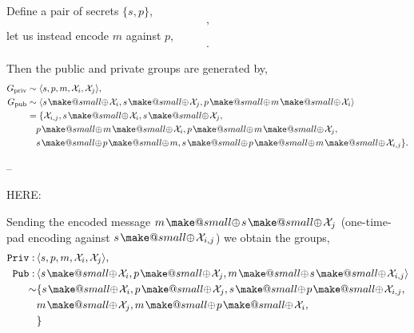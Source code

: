 \documentclass[twocolumn, aps, amsmath, amssymb, nofootinbib, superscriptaddress, longbibliography, doublefloatfix, table-of-contents, eqsecnum, rmp]{revtex4-2}
\makeatletter
\newcommand{\soplus}{{{\hspace{1pt}}{\mathbin{\mathpalette\make@small{\mathbin\oplus}}}}{\hspace{1pt}}}
\newcommand{\make@small}[2]{%
  \vcenter{\hbox{%
    \scalebox{0.6}{$\m@th#1#2$}%
  }}%
}
\makeatother
\begin{document}
Define a pair of secrets $\{s,p\}$,
\begin{align}
	[s, s\soplus p],
\end{align}
let us instead encode $m$ against $p$,
 \begin{align}
	[p, m\soplus p \soplus \mathcal{X}_i].
\end{align}

Then the public and private groups are generated by,
\begin{align}
	G_\mathrm{priv} &\sim \langle s,p,m,\mathcal{X}_i,\mathcal{X}_j \rangle, \nonumber\\
	G_\mathrm{pub} &\sim \langle s\soplus \mathcal{X}_i, s\soplus \mathcal{X}_j, p\soplus m\soplus \mathcal{X}_i \rangle \nonumber\\
	&= \{ \mathcal{X}_{i,j}, s\soplus \mathcal{X}_i, s\soplus \mathcal{X}_j, \nonumber\\
	&\quad p\soplus m\soplus \mathcal{X}_i, p\soplus m\soplus \mathcal{X}_j, \nonumber\\
	&\quad s\soplus p \soplus m, s \soplus p\soplus m \soplus \mathcal{X}_{i,j} \}.
\end{align}


--

HERE:

Sending the encoded message $m\soplus s \soplus \mathcal{X}_{j}$ (one-time-pad encoding against $s\soplus \mathcal{X}_{i,j}$) we obtain the groups,
\begin{align}
	\mathtt{Priv}:\, &\langle s, p, m, \mathcal{X}_i, \mathcal{X}_j\rangle,\nonumber\\
	\mathtt{Pub}:\, &\langle s\soplus \mathcal{X}_i, p\soplus \mathcal{X}_j, m \soplus s \soplus \mathcal{X}_{i,j} \rangle \nonumber\\
	\sim &\{ s\soplus \mathcal{X}_i, p\soplus \mathcal{X}_j, s\soplus p\soplus \mathcal{X}_{i,j},\nonumber\\
	&m \soplus \mathcal{X}_j, m \soplus p \soplus \mathcal{X}_i,\nonumber\\
	& \} %
\end{align}
\end{document}
